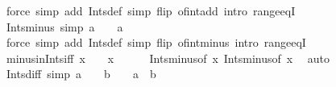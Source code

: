 \begin{isabellebody}
\isamarkupfalse%
\ {\isacharparenleft}{\kern0pt}force\ simp\ add{\isacharcolon}{\kern0pt}\ Ints{\isacharunderscore}{\kern0pt}def\ simp\ flip{\isacharcolon}{\kern0pt}\ of{\isacharunderscore}{\kern0pt}int{\isacharunderscore}{\kern0pt}add\ intro{\isacharcolon}{\kern0pt}\ range{\isacharunderscore}{\kern0pt}eqI{\isacharparenright}{\kern0pt}%
\endisatagproof
{\isafoldproof}%
%
\isadelimproof
\isanewline
%
\endisadelimproof
\isanewline
{}\isamarkupfalse%
\ Ints{\isacharunderscore}{\kern0pt}minus\ {\isacharbrackleft}{\kern0pt}simp{\isacharbrackright}{\kern0pt}{\isacharcolon}{\kern0pt}\ {\isachardoublequoteopen}a\ {\isasymin}\ {\isasymint}\ {\isasymLongrightarrow}\ {\isacharminus}{\kern0pt}a\ {\isasymin}\ {\isasymint}{\isachardoublequoteclose}\isanewline
%
\isadelimproof
\ \ %
\endisadelimproof
%
\isatagproof
{}\isamarkupfalse%
\ {\isacharparenleft}{\kern0pt}force\ simp\ add{\isacharcolon}{\kern0pt}\ Ints{\isacharunderscore}{\kern0pt}def\ simp\ flip{\isacharcolon}{\kern0pt}\ of{\isacharunderscore}{\kern0pt}int{\isacharunderscore}{\kern0pt}minus\ intro{\isacharcolon}{\kern0pt}\ range{\isacharunderscore}{\kern0pt}eqI{\isacharparenright}{\kern0pt}%
\endisatagproof
{\isafoldproof}%
%
\isadelimproof
\isanewline
%
\endisadelimproof
\isanewline
{}\isamarkupfalse%
\ minus{\isacharunderscore}{\kern0pt}in{\isacharunderscore}{\kern0pt}Ints{\isacharunderscore}{\kern0pt}iff{\isacharcolon}{\kern0pt}\ {\isachardoublequoteopen}{\isacharminus}{\kern0pt}x\ {\isasymin}\ {\isasymint}\ {\isasymlongleftrightarrow}\ x\ {\isasymin}\ {\isasymint}{\isachardoublequoteclose}\isanewline
%
\isadelimproof
\ \ %
\endisadelimproof
%
\isatagproof
{}\isamarkupfalse%
\ Ints{\isacharunderscore}{\kern0pt}minus{\isacharbrackleft}{\kern0pt}of\ x{\isacharbrackright}{\kern0pt}\ Ints{\isacharunderscore}{\kern0pt}minus{\isacharbrackleft}{\kern0pt}of\ {\isachardoublequoteopen}{\isacharminus}{\kern0pt}x{\isachardoublequoteclose}{\isacharbrackright}{\kern0pt}\ \isamarkupfalse%
\ auto%
\endisatagproof
{\isafoldproof}%
%
\isadelimproof
\isanewline
%
\endisadelimproof
\isanewline
{}\isamarkupfalse%
\ Ints{\isacharunderscore}{\kern0pt}diff\ {\isacharbrackleft}{\kern0pt}simp{\isacharbrackright}{\kern0pt}{\isacharcolon}{\kern0pt}\ {\isachardoublequoteopen}a\ {\isasymin}\ {\isasymint}\ {\isasymLongrightarrow}\ b\ {\isasymin}\ {\isasymint}\ {\isasymLongrightarrow}\ a\ {\isacharminus}{\kern0pt}\ b\ {\isasymin}\ {\isasymint}{\isachardoublequoteclose}\isanewline
%
\isadelimproof
\ \ %
\endisadelimproof
%
\isatagproof

\end{isabellebody}
